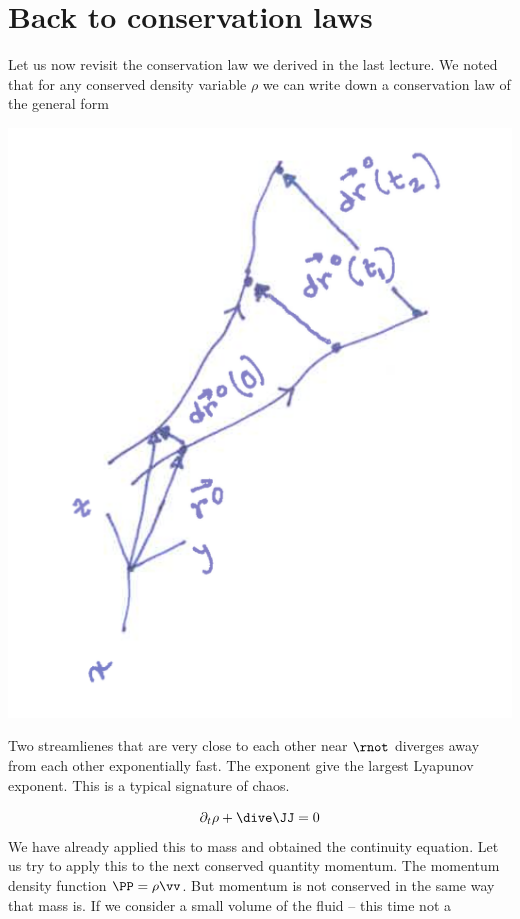 \section{Back to conservation laws}
Let us now revisit the conservation law we derived in the last
lecture. We noted that for any conserved density variable $\rho$ we
can write down a conservation law of the general form
\begin{marginfigure}
\includegraphics{figures/Lyapunov.png}
\caption{Two streamlienes that are very close to each other near
  $\rnot$ diverges away from each other exponentially fast. The
  exponent give the largest Lyapunov exponent. This is a typical
  signature of chaos.}
\label{fig:Lyap}
\end{marginfigure}
\begin{equation}
\partial_t \rho + \dive \JJ = 0
\end{equation}
We have already applied this to mass and obtained the continuity
equation. Let us try to apply this to the next conserved quantity
momentum. The momentum density function 
$\PP = \rho\vv$. But momentum is not conserved in the same way that
mass is. If we consider a small volume of the fluid  -- this time not a

